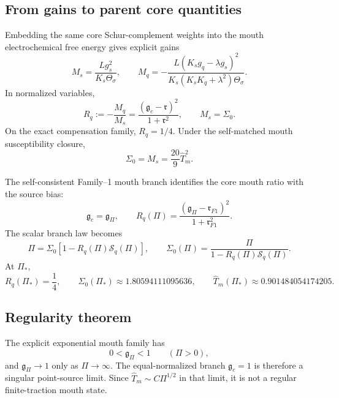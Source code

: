 \subsection{From gains to parent core quantities}
\label{subsec:app-part04-gains-parent-quantities}

Embedding the same core Schur-complement weights into the mouth electrochemical free energy gives explicit gains
\begin{equation}
\label{eq:app-part04-Ms-Mq-parent}
M_s=\frac{Lg_s^2}{K_s\Theta_\sigma},
\qquad
M_q=-\frac{L(K_sg_q-\lambda g_s)^2}{K_s(K_sK_q+\lambda^2)\Theta_\sigma}.
\end{equation}
In normalized variables,
\begin{equation}
\label{eq:app-part04-Rq-def}
R_q:=-\frac{M_q}{M_s}
=\frac{(\mathfrak g_c-\mathfrak r)^2}{1+\mathfrak r^2},
\qquad
M_s=\Sigma_0.
\end{equation}
On the exact compensation family, \(R_q=1/4\).  Under the self-matched mouth susceptibility closure,
\begin{equation}
\label{eq:app-part04-Sigma0-That}
\Sigma_0=M_s=\frac{20}{9}\widehat T_m^2.
\end{equation}

The self-consistent Family--1 mouth branch identifies the core mouth ratio with the source bias:
\begin{equation}
\label{eq:app-part04-gc-equals-gPi}
\mathfrak g_c=\mathfrak g_\Pi,
\qquad
R_q(\Pi)=\frac{(\mathfrak g_\Pi-\mathfrak r_{F1})^2}{1+\mathfrak r_{F1}^2}.
\end{equation}
The scalar branch law becomes
\begin{equation}
\label{eq:app-part04-selfconsistent-Pi-law}
\Pi=\Sigma_0\left[1-R_q(\Pi)\mathcal S_q(\Pi)\right],
\qquad
\Sigma_0(\Pi)=\frac{\Pi}{1-R_q(\Pi)\mathcal S_q(\Pi)}.
\end{equation}
At \(\Pi_*\),
\begin{equation}
\label{eq:app-part04-canonical-mouth-values}
R_q(\Pi_*)=\frac14,
\qquad
\Sigma_0(\Pi_*)\approx1.80594111095636,
\qquad
\widehat T_m(\Pi_*)\approx0.901484054174205.
\end{equation}

\subsection{Regularity theorem}
\label{subsec:app-part04-regularity-theorem}

The explicit exponential mouth family has
\begin{equation}
0<\mathfrak g_\Pi<1\qquad(\Pi>0),
\end{equation}
and \(\mathfrak g_\Pi\to1\) only as \(\Pi\to\infty\).  The equal-normalized branch \(\mathfrak g_c=1\) is therefore a singular point-source limit.  Since \(\widehat T_m\sim C\Pi^{1/2}\) in that limit, it is not a regular finite-traction mouth state.

